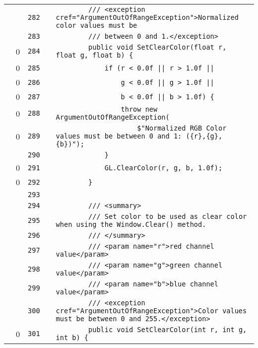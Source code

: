 \documentclass[a4paper,landscape,10pt]{article}
\begin{document}
\begin{longtable}[l]{lrrll}
\cellcolor{gray} &  & \verb~282~ & & \verb~        /// <exception cref="ArgumentOutOfRangeException">Normalized color values must be~\\
\cellcolor{gray} &  & \verb~283~ & & \verb~        /// between 0 and 1.</exception>~\\
\cellcolor{red} & 0 & \verb~284~ & & \verb~        public void SetClearColor(float r, float g, float b) {~\\
\cellcolor{red} & 0 & \verb~285~ & & \verb~            if (r < 0.0f || r > 1.0f ||~\\
\cellcolor{red} & 0 & \verb~286~ & & \verb~                g < 0.0f || g > 1.0f ||~\\
\cellcolor{red} & 0 & \verb~287~ & & \verb~                b < 0.0f || b > 1.0f) {~\\
\cellcolor{red} & 0 & \verb~288~ & & \verb~                throw new ArgumentOutOfRangeException(~\\
\cellcolor{red} & 0 & \verb~289~ & & \verb~                    $"Normalized RGB Color values must be between 0 and 1: ({r},{g},{b})");~\\
\cellcolor{gray} &  & \verb~290~ & & \verb~            }~\\
\cellcolor{red} & 0 & \verb~291~ & & \verb~            GL.ClearColor(r, g, b, 1.0f);~\\
\cellcolor{red} & 0 & \verb~292~ & & \verb~        }~\\
\cellcolor{gray} &  & \verb~293~ & & \verb~~\\
\cellcolor{gray} &  & \verb~294~ & & \verb~        /// <summary>~\\
\cellcolor{gray} &  & \verb~295~ & & \verb~        /// Set color to be used as clear color when using the Window.Clear() method.~\\
\cellcolor{gray} &  & \verb~296~ & & \verb~        /// </summary>~\\
\cellcolor{gray} &  & \verb~297~ & & \verb~        /// <param name="r">red channel value</param>~\\
\cellcolor{gray} &  & \verb~298~ & & \verb~        /// <param name="g">green channel value</param>~\\
\cellcolor{gray} &  & \verb~299~ & & \verb~        /// <param name="b">blue channel value</param>~\\
\cellcolor{gray} &  & \verb~300~ & & \verb~        /// <exception cref="ArgumentOutOfRangeException">Color values must be between 0 and 255.</exception>~\\
\cellcolor{red} & 0 & \verb~301~ & & \verb~        public void SetClearColor(int r, int g, int b) {~\\

\end{longtable}
\end{document}

